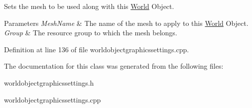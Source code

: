 Sets the mesh to be used along with this \hyperlink{classMezzanine_1_1World}{World} Object. 


\begin{DoxyParams}{Parameters}
{\em MeshName} & The name of the mesh to apply to this \hyperlink{classMezzanine_1_1World}{World} Object. \\
\hline
{\em Group} & The resource group to which the mesh belongs. \\
\hline
\end{DoxyParams}


Definition at line 136 of file worldobjectgraphicssettings.cpp.



The documentation for this class was generated from the following files:\begin{DoxyCompactItemize}
\item 
worldobjectgraphicssettings.h\item 
worldobjectgraphicssettings.cpp\end{DoxyCompactItemize}
